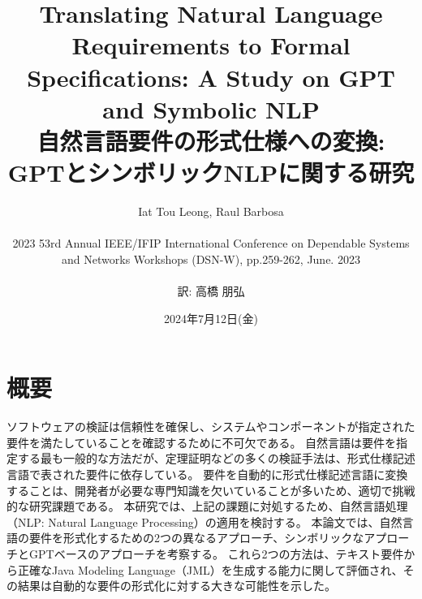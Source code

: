 \documentclass[uplatex, twocolumn, 10pt]{jsarticle} %
\begin{document}
\title{Translating Natural Language Requirements to Formal Specifications: A Study on GPT and Symbolic NLP \\
    自然言語要件の形式仕様への変換: GPTとシンボリックNLPに関する研究}
\author{Iat Tou Leong,  Raul Barbosa \\\\
    2023 53rd Annual IEEE/IFIP International Conference on Dependable Systems\\ and Networks Workshops (DSN-W), pp.259-262, June. 2023\\\\ 訳: 高橋 朋弘}
\date{2024年7月12日(金)}
\maketitle

\section*{概要} %
ソフトウェアの検証は信頼性を確保し、システムやコンポーネントが指定された要件を満たしていることを確認するために不可欠である。
自然言語は要件を指定する最も一般的な方法だが、定理証明などの多くの検証手法は、形式仕様記述言語で表された要件に依存している。
要件を自動的に形式仕様記述言語に変換することは、開発者が必要な専門知識を欠いていることが多いため、適切で挑戦的な研究課題である。
本研究では、上記の課題に対処するため、自然言語処理（NLP: Natural Language Processing）の適用を検討する。
本論文では、自然言語の要件を形式化するための2つの異なるアプローチ、シンボリックなアプローチとGPTベースのアプローチを考察する。
これら2つの方法は、テキスト要件から正確なJava Modeling Language（JML）を生成する能力に関して評価され、その結果は自動的な要件の形式化に対する大きな可能性を示した。

\end{document}
